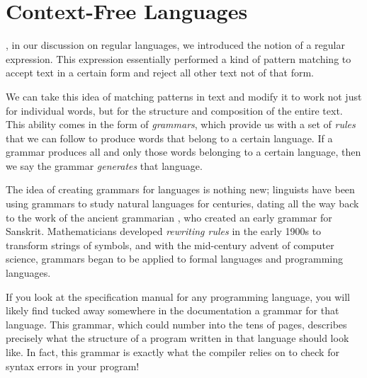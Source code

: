 \chapter{Context-Free Languages}\label{chap:contextfree}

, in our discussion on regular languages, we introduced the notion of a regular expression. This expression essentially performed a kind of pattern matching to accept text in a certain form and reject all other text not of that form.

We can take this idea of matching patterns in text and modify it to work not just for individual words, but for the structure and composition of the entire text. This ability comes in the form of \emph{grammars}, which provide us with a set of \emph{rules} that we can follow to produce words that belong to a certain language. If a grammar produces all and only those words belonging to a certain language, then we say the grammar \emph{generates} that language.

The idea of creating grammars for languages is nothing new; linguists have been using grammars to study natural languages for centuries, dating all the way back to the work of the ancient grammarian \citet{Panini500BCEAstadhyayi}, who created an early grammar for Sanskrit. Mathematicians developed \emph{rewriting rules} in the early 1900s to transform strings of symbols, and with the mid-century advent of computer science, grammars began to be applied to formal languages and programming languages.

If you look at the specification manual for any programming language, you will likely find tucked away somewhere in the documentation a grammar for that language. This grammar, which could number into the tens of pages, describes precisely what the structure of a program written in that language should look like. In fact, this grammar is exactly what the compiler relies on to check for syntax errors in your program!


